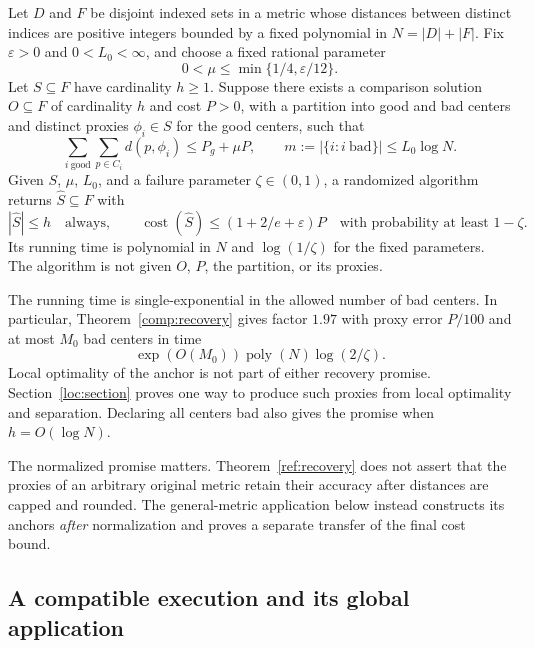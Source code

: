 \begin{theorem}\label{ref:recovery}
Let $D$ and $F$ be disjoint indexed sets in a metric whose distances
between distinct indices are positive integers bounded by a fixed
polynomial in $N=|D|+|F|$.
Fix $\varepsilon>0$ and $0<L_0<\infty$, and choose a fixed rational parameter
\[
 0<\mu\le \min\{1/4,\varepsilon/12\}.
\]
Let $S\subseteq F$ have cardinality $h\ge1$.  Suppose there exists a comparison
solution $O\subseteq F$ of cardinality $h$ and cost $P>0$, with a partition into
good and bad centers and distinct proxies $\phi_i\in S$ for the good centers,
such that
\begin{equation}\label{ref:proxy-hypothesis}
 \sum_{i\ \mathrm{good}}\sum_{p\in C_i}d(p,\phi_i)
 \le P_g+\mu P,
 \qquad m:=|\{i:i\ \mathrm{bad}\}|\le L_0\log N.
\end{equation}
Given $S$, $\mu$, $L_0$, and a failure parameter $\zeta\in(0,1)$, a randomized
algorithm returns $\widehat S\subseteq F$ with
\[
 |\widehat S|\le h
 \quad\text{always},\qquad
 \operatorname{cost}(\widehat S)
 \le (1+2/e+\varepsilon)P
 \quad\text{with probability at least }1-\zeta.
\]
Its running time is polynomial in $N$ and $\log(1/\zeta)$ for the fixed
parameters.  The algorithm is not given $O$, $P$, the partition, or its proxies.
\end{theorem}

The running time is single-exponential in the allowed number of bad
centers.  In particular, Theorem~\ref{comp:recovery} gives factor $1.97$
with proxy error $P/100$ and at most $M_0$ bad centers in time
\[
 \exp(O(M_0))\operatorname{poly}(N)\log(2/\zeta).
\]
Local optimality of the anchor is not part of either recovery promise.
Section~\ref{loc:section} proves one way to produce such proxies from
local optimality and separation.  Declaring all centers bad also gives
the promise when $h=O(\log N)$.

The normalized promise matters.  Theorem~\ref{ref:recovery} does not
assert that the proxies of an arbitrary original metric retain their
accuracy after distances are capped and rounded.  The general-metric
application below instead constructs its anchors \emph{after}
normalization and proves a separate transfer of the final cost bound.

\subsection{A compatible execution and its global application}

